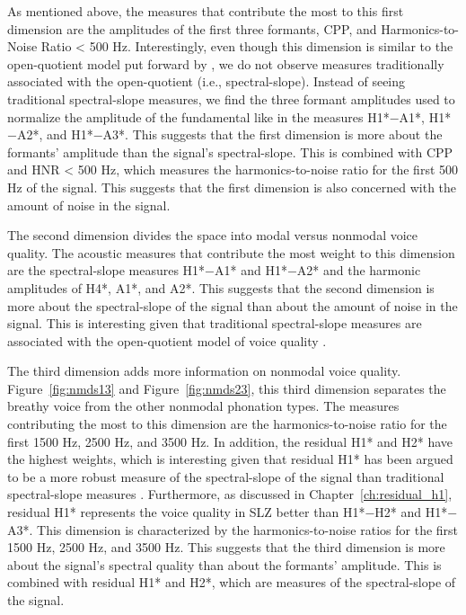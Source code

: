As mentioned above, the measures that contribute the most to this first dimension are the amplitudes of the first three formants, CPP, and Harmonics-to-Noise Ratio < 500 Hz. Interestingly, even though this dimension is similar to the open-quotient model put forward by \citet{gordonPhonationTypesCrosslinguistic2001}, we do not observe measures traditionally associated with the open-quotient (i.e., spectral-slope). Instead of seeing traditional spectral-slope measures, we find the three formant amplitudes used to normalize the amplitude of the fundamental like in the measures H1*$-$A1*, H1*$-$A2*, and H1*$-$A3*. This suggests that the first dimension is more about the formants' amplitude than the signal's spectral-slope. This is combined with CPP and HNR < 500 Hz, which measures the harmonics-to-noise ratio for the first 500 Hz of the signal. This suggests that the first dimension is also concerned with the amount of noise in the signal.

The second dimension divides the space into modal versus nonmodal voice quality. The acoustic measures that contribute the most weight to this dimension are the spectral-slope measures H1*$-$A1* and H1*$-$A2* and the harmonic amplitudes of H4*, A1*, and A2*. This suggests that the second dimension is more about the spectral-slope of the signal than about the amount of noise in the signal. This is interesting given that traditional spectral-slope measures are associated with the open-quotient model of voice quality \citep{holmbergComparisonsAerodynamicElectroglottographic1995,kreimanMeasuresGlottalSource2007,garellekModelingVoiceSource2016,garellekPhoneticsVoice2019,chaiH1H2AcousticMeasure2022}.

The third dimension adds more information on nonmodal voice quality. Figure~\ref{fig:nmds13} and Figure~\ref{fig:nmds23}, this third dimension separates the breathy voice from the other nonmodal phonation types. The measures contributing the most to this dimension are the harmonics-to-noise ratio for the first 1500 Hz, 2500 Hz, and 3500 Hz. In addition, the residual H1* and H2* have the highest weights, which is interesting given that residual H1* has been argued to be a more robust measure of the spectral-slope of the signal than traditional spectral-slope measures \citep{chaiH1H2AcousticMeasure2022,brinkerhoffResidualH1Measure2024}. Furthermore, as discussed in Chapter~\ref{ch:residual_h1}, residual H1* represents the voice quality in SLZ better than H1*$-$H2* and H1*$-$A3*. This dimension is characterized by the harmonics-to-noise ratios for the first 1500 Hz, 2500 Hz, and 3500 Hz. This suggests that the third dimension is more about the signal's spectral quality than about the formants' amplitude. This is combined with residual H1* and H2*, which are measures of the spectral-slope of the signal.

